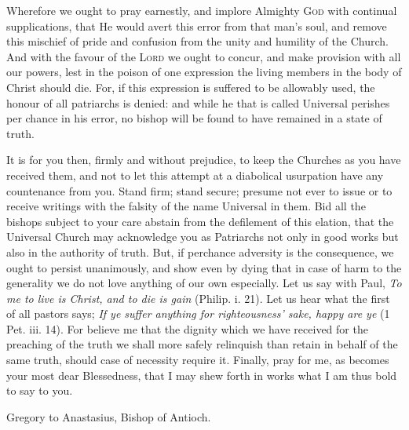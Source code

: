 Wherefore we ought to pray earnestly, and implore Almighty \textsc{God} with continual supplications, that He would avert this error from that man’s soul, and remove this mischief of pride and confusion from the unity and humility of the Church. And with the favour of the \textsc{Lord} we ought to concur, and make provision with all our powers, lest in the poison of one expression the living members in the body of Christ should die. For, if this expression is suffered to be allowably used, the honour of all patriarchs is denied: and while he that is called Universal perishes per chance in his error, no bishop will be found to have remained in a state of truth.

It is for you then, firmly and without prejudice, to keep the Churches as you have received them, and not to let this attempt at a diabolical usurpation have any countenance from you. Stand firm; stand secure; presume not ever to issue or to receive writings with the falsity of the name Universal in them. Bid all the bishops subject to your care abstain from the defilement of this elation, that the Universal Church may acknowledge you as Patriarchs not only in good works but also in the authority of truth. But, if perchance adversity is the consequence, we ought to persist unanimously, and show even by dying that in case of harm to the generality we do not love anything of our own especially. Let us say with Paul, \emph{To me to live is Christ, and to die is gain} (Philip. i. 21). Let us hear what the first of all pastors says; \emph{If ye suffer anything for righteousness’ sake, happy are ye} (1 Pet. iii. 14). For believe me that the dignity which we have received for the preaching of the truth we shall more safely relinquish than retain in behalf of the same truth, should case of necessity require it. Finally, pray for me, as becomes your most dear Blessedness, that I may shew forth in works what I am thus bold to say to you.


Gregory to Anastasius, Bishop of Antioch.

